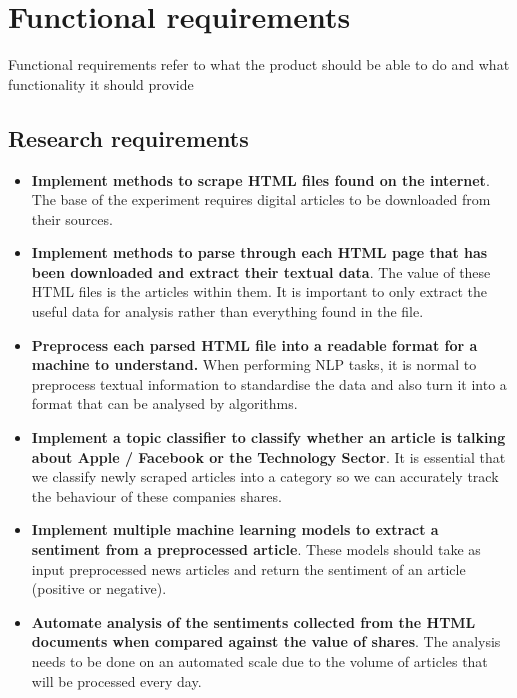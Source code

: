 \documentclass[a4paper,11pt]{report}
\begin{document}
\section{Functional requirements}

Functional requirements refer to what the product should be able to do and what functionality it should provide

\subsection {Research requirements}
\begin{itemize}
  \item \textbf{Implement methods to scrape HTML files found on the internet}. The base of the experiment requires digital articles to be downloaded from their sources.
  \item \textbf{Implement methods to parse through each HTML page that has been downloaded and extract their textual data}. The value of these HTML files is the articles within them. It is important to only extract the useful data for analysis rather than everything found in the file.
    \item \textbf{Preprocess each parsed HTML file into a readable format for a machine to understand.} When performing NLP tasks, it is normal to preprocess textual information to standardise the data and also turn it into a format that can be analysed by algorithms.
    \item \textbf{Implement a topic classifier to classify whether an article is talking about Apple / Facebook or the Technology Sector}. It is essential that we classify newly scraped articles into a category so we can accurately track the behaviour of these companies shares.
    \item \textbf{Implement multiple machine learning models to extract a sentiment from a preprocessed article}. These models should take as input preprocessed news articles and return the sentiment of an article (positive or negative).
    \item \textbf{Automate analysis of the sentiments collected from the HTML documents when compared against the value of shares}. The analysis needs to be done on an automated scale due to the volume of articles that will be processed every day.
\end{itemize}
\end{document}
